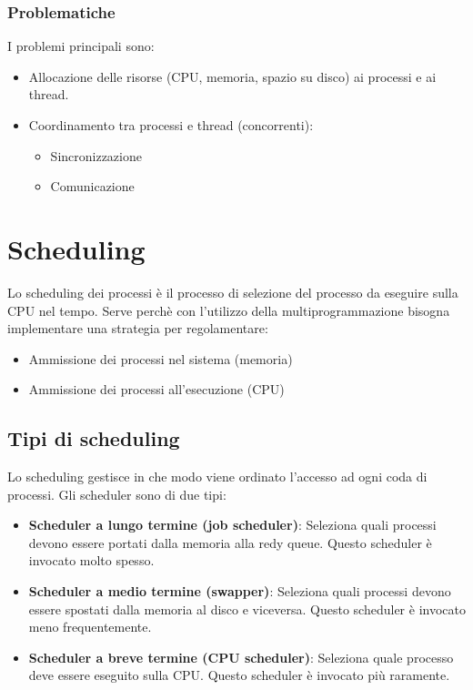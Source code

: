 \documentclass[a4paper]{article}
\begin{document}
\subsubsection{Problematiche}
I problemi principali sono:
\begin{itemize}
  \item Allocazione delle risorse (CPU, memoria, spazio su disco) ai
    processi e ai thread.
  \item Coordinamento tra processi e thread (concorrenti):
    \begin{itemize}
      \item Sincronizzazione
      \item Comunicazione
    \end{itemize}
\end{itemize}

\section{Scheduling}
Lo scheduling dei processi è il processo di selezione del processo da eseguire
sulla CPU nel tempo. Serve perchè con l'utilizzo della multiprogrammazione bisogna
implementare una strategia per regolamentare:
\begin{itemize}
  \item Ammissione dei processi nel sistema (memoria)
  \item Ammissione dei processi all'esecuzione (CPU)
\end{itemize}

\subsection{Tipi di scheduling}
Lo scheduling gestisce in che modo viene ordinato l'accesso ad ogni coda di processi.
Gli scheduler sono di due tipi:
\begin{itemize}
  \item \textbf{Scheduler a lungo termine (job scheduler)}: Seleziona quali processi 
    devono essere portati dalla memoria alla redy queue. Questo scheduler è invocato
    molto spesso.
  \item \textbf{Scheduler a medio termine (swapper)}: Seleziona quali processi
    devono essere spostati dalla memoria al disco e viceversa. Questo scheduler è
    invocato meno frequentemente.
  \item \textbf{Scheduler a breve termine (CPU scheduler)}: Seleziona quale processo
    deve essere eseguito sulla CPU. Questo scheduler è invocato più raramente.
\end{itemize}
\end{document}
